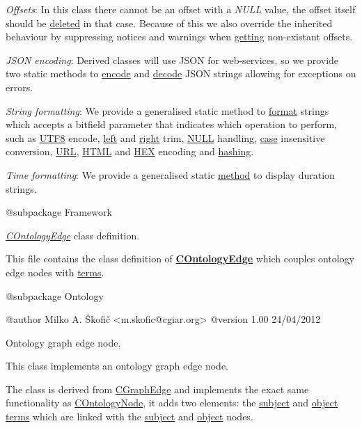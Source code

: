 \begin{DoxyItemize}
\item {\itshape Offsets}\-: In this class there cannot be an offset with a {\itshape N\-U\-L\-L} value, the offset itself should be \hyperlink{}{deleted} in that case. Because of this we also override the inherited behaviour by suppressing notices and warnings when \hyperlink{}{getting} non-\/existant offsets. 
\item {\itshape J\-S\-O\-N encoding}\-: Derived classes will use J\-S\-O\-N for web-\/services, so we provide two static methods to \hyperlink{}{encode} and \hyperlink{}{decode} J\-S\-O\-N strings allowing for exceptions on errors. 
\item {\itshape String formatting}\-: We provide a generalised static method to \hyperlink{}{format} strings which accepts a bitfield parameter that indicates which operation to perform, such as \hyperlink{}{U\-T\-F8} encode, \hyperlink{}{left} and \hyperlink{}{right} trim, \hyperlink{}{N\-U\-L\-L} handling, \hyperlink{}{case} insensitive conversion, \hyperlink{}{U\-R\-L}, \hyperlink{}{H\-T\-M\-L} and \hyperlink{}{H\-E\-X} encoding and \hyperlink{}{hashing}. 
\item {\itshape Time formatting}\-: We provide a generalised static \hyperlink{}{method} to display duration strings. 
\end{DoxyItemize}

\begin{DoxyVerb} @subpackage        Framework\end{DoxyVerb}


{\itshape \hyperlink{class_c_ontology_edge}{C\-Ontology\-Edge}} class definition.

This file contains the class definition of {\bfseries \hyperlink{class_c_ontology_edge}{C\-Ontology\-Edge}} which couples ontology edge nodes with \hyperlink{class_c_ontology_term}{terms}.

\begin{DoxyVerb} @subpackage        Ontology

 @author            Milko A. Škofič <m.skofic@cgiar.org>
 @version   1.00 24/04/2012\end{DoxyVerb}


Ontology graph edge node.

This class implements an ontology graph edge node.

The class is derived from \hyperlink{class_c_graph_edge}{C\-Graph\-Edge} and implements the exact same functionality as \hyperlink{class_c_ontology_node}{C\-Ontology\-Node}, it adds two elements\-: the \hyperlink{}{subject} and \hyperlink{}{object} \hyperlink{class_c_ontology_term}{terms} which are linked with the \hyperlink{}{subject} and \hyperlink{}{object} nodes.

